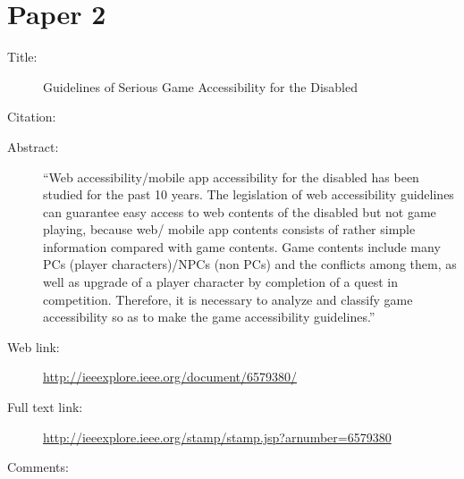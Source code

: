 \documentclass{scrartcl}
\begin{document}
\section*{Paper 2}
\begin{description}
\item[Title:] Guidelines of Serious Game Accessibility for the Disabled
\item[Citation:] \cite{HJ}
\item[Abstract:] ``Web accessibility/mobile app accessibility for the disabled has been studied for the past 10 years. The legislation of web accessibility guidelines can guarantee easy access to web contents of the disabled but not game playing, because web/ mobile app contents consists of rather simple information compared with game contents. Game contents include many PCs (player characters)/NPCs (non PCs) and the conflicts among them, as well as upgrade of a player character by completion of a quest in competition. Therefore, it is necessary to analyze and classify game accessibility so as to make the game accessibility guidelines.''
\item[Web link:] \url {http://ieeexplore.ieee.org/document/6579380/}
\item[Full text link:] \url {http://ieeexplore.ieee.org/stamp/stamp.jsp?arnumber=6579380}
\item[Comments:] 
\end{description}
\end{document}
